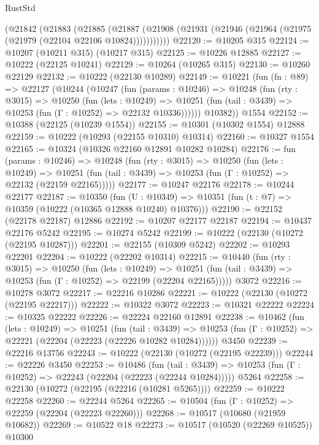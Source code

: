 \begin{lexlean}{RustStd}
\begin{coremodule}
    (@21842
      (@21883
        (@21885
          (@21887 (@21908 (@21931 (@21946 (@21964 (@21975 (@21979 (@22104 @22106 @10824)))))))))))
@22120 := @10205 @315
@22124 := @10207 (@10211 @315) (@10217 @315)
@22125 := @10226 @12885
@22127 := @10222 (@22125 @10241)
@22129 := @10264 (@10265 @315)
@22130 := @10260 @22129
@22132 := @10222 (@22130 @10289)
@22149 := @10221
    (fun (fn : @89) =>
    @22127
      (@10244
        (@10247
          (fun (params : @10246) =>
          @10248
            (fun (rty : @3015) =>
            @10250
              (fun (lets : @10249) =>
              @10251 (fun (tail : @3439) => @10253 (fun (Γ : @10252) => @22132 @10336))))))
        @10382))
    @1554
@22152 := @10388 (@22125 (@10239 @1554))
@22155 := @10301 (@10302 @1554) @12888
@22159 := @10222 (@10293 (@22155 @10310) @10314)
@22160 := @10327 @1554
@22165 := @10324 (@10326 @22160 @12891 @10282 @10284)
@22176 := fun (params : @10246) =>
  @10248
    (fun (rty : @3015) =>
    @10250
      (fun (lets : @10249) =>
      @10251 (fun (tail : @3439) => @10253 (fun (Γ : @10252) => @22132 (@22159 @22165)))))
@22177 := @10247 @22176
@22178 := @10244 @22177
@22187 := @10350
    (fun (U : @10349) => @10351 (fun (t : @7) => @10359 (@10222 (@10365 @12888 @10240) @10376)))
@22190 := @22152 (@22178 @22187) @12886
@22192 := @10207 @22177 @22187
@22194 := @10437 @22176 @5242
@22195 := @10274 @5242
@22199 := @10222 (@22130 (@10272 (@22195 @10287)))
@22201 := @22155 (@10309 @5242)
@22202 := @10293 @22201
@22204 := @10222 (@22202 @10314)
@22215 := @10440
    (fun (rty : @3015) =>
    @10250
      (fun (lets : @10249) =>
      @10251 (fun (tail : @3439) => @10253 (fun (Γ : @10252) => @22199 (@22204 @22165)))))
    @3072
@22216 := @10278 @3072
@22217 := @22216 @10286
@22221 := @10222 (@22130 (@10272 (@22195 @22217)))
@22222 := @10322 @3072
@22223 := @10321 @22222
@22224 := @10325 @22222
@22226 := @22224 @22160 @12891
@22238 := @10462
    (fun (lets : @10249) =>
    @10251
      (fun (tail : @3439) =>
      @10253 (fun (Γ : @10252) => @22221 (@22204 (@22223 (@22226 @10282 @10284))))))
    @3450
@22239 := @22216 @13756
@22243 := @10222 (@22130 (@10272 (@22195 @22239)))
@22244 := @22226 @3450
@22253 := @10486
    (fun (tail : @3439) => @10253 (fun (Γ : @10252) => @22243 (@22204 (@22223 (@22244 @10284)))))
    @5264
@22258 := @22130 (@10272 (@22195 (@22216 (@10281 @5265))))
@22259 := @10222 @22258
@22260 := @22244 @5264
@22265 := @10504 (fun (Γ : @10252) => @22259 (@22204 (@22223 @22260)))
@22268 := @10517 (@10680 (@21959 @10682))
@22269 := @10522 @18
@22273 := @10517 (@10520 (@22269 @10525)) @10300

\end{coremodule}
\end{lexlean}
